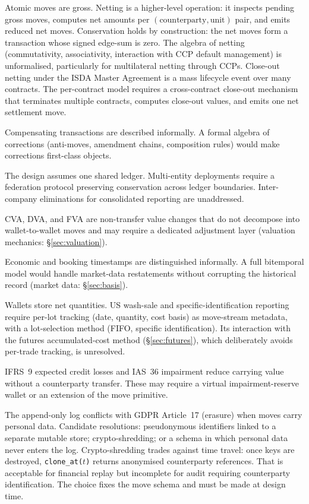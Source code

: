 \begin{description}[nosep]
\item[Netting and close-out.] Atomic moves are gross. Netting is a higher-level operation: it inspects pending gross moves, computes net amounts per $(\text{counterparty},\text{unit})$ pair, and emits reduced net moves. Conservation holds by construction: the net moves form a transaction whose signed edge-sum is zero. The algebra of netting (commutativity, associativity, interaction with CCP default management) is unformalised, particularly for multilateral netting through CCPs. Close-out netting under the ISDA Master Agreement is a mass lifecycle event over many contracts. The per-contract model requires a cross-contract close-out mechanism that terminates multiple contracts, computes close-out values, and emits one net settlement move.
\item[Correction algebra.] Compensating transactions are described informally. A formal algebra of corrections (anti-moves, amendment chains, composition rules) would make corrections first-class objects.
\item[Multi-entity federation.] The design assumes one shared ledger. Multi-entity deployments require a federation protocol preserving conservation across ledger boundaries. Inter-company eliminations for consolidated reporting are unaddressed.
\item[XVA.] CVA, DVA, and FVA are non-transfer value changes that do not decompose into wallet-to-wallet moves and may require a dedicated adjustment layer (valuation mechanics: \S\ref{sec:valuation}).
\item[Bitemporal semantics.] Economic and booking timestamps are distinguished informally. A full bitemporal model would handle market-data restatements without corrupting the historical record (market data: \S\ref{sec:basis}).
\item[Tax-lot tracking.] Wallets store net quantities. US wash-sale and specific-identification reporting require per-lot tracking (date, quantity, cost basis) as move-stream metadata, with a lot-selection method (FIFO, specific identification). Its interaction with the futures accumulated-cost method (\S\ref{sec:futures}), which deliberately avoids per-trade tracking, is unresolved.
\item[Impairment and ECL.] IFRS~9 expected credit losses and IAS~36 impairment reduce carrying value without a counterparty transfer. These may require a virtual impairment-reserve wallet or an extension of the move primitive.
\item[Data privacy and GDPR.] The append-only log conflicts with GDPR Article~17 (erasure) when moves carry personal data. Candidate resolutions: pseudonymous identifiers linked to a separate mutable store; crypto-shredding; or a schema in which personal data never enters the log. Crypto-shredding trades against time travel: once keys are destroyed, \allowbreak\texttt{clone\_at(\allowbreak$t$)} returns anony\-mised counterparty references. That is acceptable for financial replay but incomplete for audit requiring counterparty identification. The choice fixes the move schema and must be made at design time.

\end{description}
